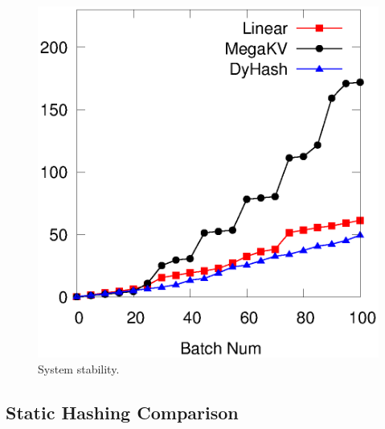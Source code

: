 \begin{figure}[ht]
\begin{minipage}{0.19\linewidth}
		\centerline{\dsali}
	\end{minipage}
	\begin{minipage}{0.19\linewidth}\centering
		\includegraphics[width=\linewidth]{pic/dynamic-stability/dynamic-sta-random.eps}
		\centerline{\dsrandom}
	\end{minipage}
	\caption{System stability.}
	\label{fig:stability}
\end{figure}


\subsection{Static Hashing Comparison}\label{sec:exp:static}

